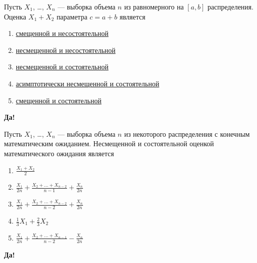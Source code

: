 \documentclass[t]{beamer}
\begin{document}
 \begin{frame} \label{1-Yes} 
\begin{block}{1} 

Пусть $X_1$, \ldots, $X_n$ — выборка объема $n$ из равномерного на $[a, b]$ распределения. Оценка $X_1+X_2$ параметра $c=a+b$ является
 


 \end{block} 
\begin{enumerate} 
\item[] \hyperlink{1-No}{\beamergotobutton{} смещенной и несостоятельной}
\item[] \hyperlink{1-Yes}{\beamergotobutton{} несмещенной и несостоятельной}
\item[] \hyperlink{1-No}{\beamergotobutton{} несмещенной и состоятельной}
\item[] \hyperlink{1-No}{\beamergotobutton{} асимптотически несмещенной и состоятельной}
\item[] \hyperlink{1-No}{\beamergotobutton{} смещенной и состоятельной}
\end{enumerate} 

 \textbf{Да!} 
 \hyperlink{2}{}\end{frame} 


 \begin{frame} \label{2-Yes} 
\begin{block}{2} 

Пусть $X_1$, \ldots, $X_n$ — выборка объема $n$ из некоторого распределения с конечным математическим ожиданием. Несмещенной и состоятельной оценкой математического ожидания является
 


 \end{block} 
\begin{enumerate} 
\item[] \hyperlink{2-No}{\beamergotobutton{} $\frac{X_1+X_2}{2}$}
\item[] \hyperlink{2-No}{\beamergotobutton{} $\frac{X_1}{2 n}+\frac{X_2+\ldots+X_{n-2}}{n-1}+\frac{X_n}{2 n}$}
\item[] \hyperlink{2-No}{\beamergotobutton{} $\frac{X_1}{2 n}+\frac{X_2+\ldots+X_{n-2}}{n-2}+\frac{X_n}{2 n}$}
\item[] \hyperlink{2-No}{\beamergotobutton{} $\frac{1}{3} X_1 + \frac{2}{3} X_2$}
\item[] \hyperlink{2-Yes}{\beamergotobutton{} $\frac{X_1}{2 n}+\frac{X_2+\ldots+X_{n-1}}{n-2}-\frac{X_n}{2 n}$}
\end{enumerate} 

 \textbf{Да!} 
 \hyperlink{3}{}\end{frame} 
\end{document}
